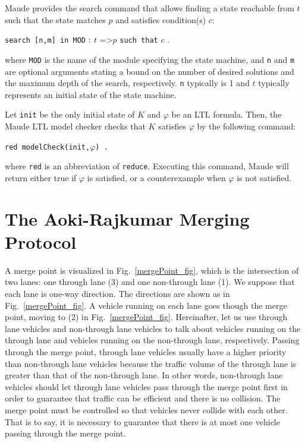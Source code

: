 \documentclass[10pt, conference, compsocconf]{IEEEtran}
\begin{document}
Maude provides the search command that allows finding a state reachable from
$t$ such that the state matches $p$ and satisfies condition(s) $c$:

\medskip
	\noindent
	\verb!search [n,m] in MOD! $:\ t$ =\textgreater* $p$ \verb!such that! $c$ .
\medskip

\noindent
where \verb!MOD! is the name of the module specifying the state
machine, and \verb!n! and \verb!m! are optional arguments stating a
bound on the number of desired solutions and the maximum depth of the
search, respectively.  \verb!n! typically is 1 and $t$ typically
represents an initial state of the state machine.

 Let \verb!init! be the only initial state of $K$ and $\varphi$ be an LTL
 formula. Then, the Maude LTL model checker checks that
 $K$ satisfies $\varphi$ by the following command:
 
 \smallskip
 \begin{small}
 	\noindent
 	\verb!red modelCheck(init,!$\varphi$\verb!) .!
 \end{small}
 \smallskip
 
 \noindent
 where \verb!red! is an abbreviation of \verb!reduce!. 
 Executing this command, Maude will return either true if $\varphi$ is satisfied, or a counterexample when $\varphi$ is not satisfied.


 
\section{The Aoki-Rajkumar Merging Protocol}
 \label{sect_oriproto}

A merge point is visualized in Fig.~\ref{mergePoint_fig}, which is the
intersection of two lanes: one through lane (3) and one non-through
lane (1).  We suppose that each lane is one-way direction.  The
directions are shown as in Fig.~\ref{mergePoint_fig}. A vehicle
running on each lane goes though the merge point, moving to (2) in
Fig.~\ref{mergePoint_fig}. Hereinafter, let us use through lane
vehicles and non-through lane vehicles to talk about vehicles running
on the through lane and vehicles running on the non-through lane,
respectively.  Passing through the merge point, through lane vehicles
usually have a higher priority than non-through lane vehicles because
the traffic volume of the through lane is greater than that of the
non-through lane. In other words, non-through lane vehicles should let
through lane vehicles pass through the merge point first in order to
guarantee that traffic can be efficient and there is no collision.
The merge point must be controlled so that vehicles never collide with
each other.  That is to say, it is necessary to guarantee that there
is at most one vehicle passing through the merge point.
\end{document}
